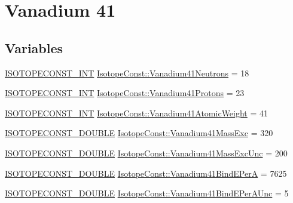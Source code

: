 \hypertarget{group___isotope_const-_vanadium-_v41}{}\section{Vanadium 41}
\label{group___isotope_const-_vanadium-_v41}
\subsection*{Variables}
\begin{DoxyCompactItemize}
\item 
\mbox{\hyperlink{group___isotope_const-_macros_ga5f18360b3e99483a35c32d789e62621c}{I\+S\+O\+T\+O\+P\+E\+C\+O\+N\+S\+T\+\_\+\+I\+NT}} \mbox{\hyperlink{group___isotope_const-_vanadium-_v41_ga19b08f4b0cf7c0ed0823f47a03d3727d}{Isotope\+Const\+::\+Vanadium41\+Neutrons}} = 18
\item 
\mbox{\hyperlink{group___isotope_const-_macros_ga5f18360b3e99483a35c32d789e62621c}{I\+S\+O\+T\+O\+P\+E\+C\+O\+N\+S\+T\+\_\+\+I\+NT}} \mbox{\hyperlink{group___isotope_const-_vanadium-_v41_ga08552ad056a73023324b3ae0def058d3}{Isotope\+Const\+::\+Vanadium41\+Protons}} = 23
\item 
\mbox{\hyperlink{group___isotope_const-_macros_ga5f18360b3e99483a35c32d789e62621c}{I\+S\+O\+T\+O\+P\+E\+C\+O\+N\+S\+T\+\_\+\+I\+NT}} \mbox{\hyperlink{group___isotope_const-_vanadium-_v41_ga61cc276de8a818dcf2b2a471ced41d81}{Isotope\+Const\+::\+Vanadium41\+Atomic\+Weight}} = 41
\item 
\mbox{\hyperlink{group___isotope_const-_macros_ga8f45a7272ce02c0b4c65c44636ed719a}{I\+S\+O\+T\+O\+P\+E\+C\+O\+N\+S\+T\+\_\+\+D\+O\+U\+B\+LE}} \mbox{\hyperlink{group___isotope_const-_vanadium-_v41_gab28ff565cff7e496a3e36d2ee2698687}{Isotope\+Const\+::\+Vanadium41\+Mass\+Exc}} = 320
\item 
\mbox{\hyperlink{group___isotope_const-_macros_ga8f45a7272ce02c0b4c65c44636ed719a}{I\+S\+O\+T\+O\+P\+E\+C\+O\+N\+S\+T\+\_\+\+D\+O\+U\+B\+LE}} \mbox{\hyperlink{group___isotope_const-_vanadium-_v41_ga86098dba5f08bac0261d45c5a79823be}{Isotope\+Const\+::\+Vanadium41\+Mass\+Exc\+Unc}} = 200
\item 
\mbox{\hyperlink{group___isotope_const-_macros_ga8f45a7272ce02c0b4c65c44636ed719a}{I\+S\+O\+T\+O\+P\+E\+C\+O\+N\+S\+T\+\_\+\+D\+O\+U\+B\+LE}} \mbox{\hyperlink{group___isotope_const-_vanadium-_v41_ga9be521f959495f683f1bf2e099ec5a07}{Isotope\+Const\+::\+Vanadium41\+Bind\+E\+PerA}} = 7625
\item 
\mbox{\hyperlink{group___isotope_const-_macros_ga8f45a7272ce02c0b4c65c44636ed719a}{I\+S\+O\+T\+O\+P\+E\+C\+O\+N\+S\+T\+\_\+\+D\+O\+U\+B\+LE}} \mbox{\hyperlink{group___isotope_const-_vanadium-_v41_ga9c269a464f0ddfefeefce9dc6b67dc80}{Isotope\+Const\+::\+Vanadium41\+Bind\+E\+Per\+A\+Unc}} = 5

\end{DoxyCompactItemize}
